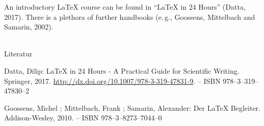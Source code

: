 
An introductory \LaTeX{} course can be found in \enquote{\LaTeX{} in 24 Hours} (Datta, 2017).
There is a plethora of further handbooks (e.\,g., Goossens, Mittelbach and Samarin, 2002).

~\\

\noindent Literatur

\noindent [Datta 2017] Datta, Dilip: LaTeX in 24 Hours - A Practical Guide for Scientific Writing. Springer, 2017. \url{http://dx.doi.org/10.1007/978-3-319-47831-9}. – ISBN 978–3–319–47830–2

\noindent [Goossens u. a. 2010] Goossens, Michel ; Mittelbach, Frank ; Samarin, Alexander: Der LaTeX Begleiter. Addison-Wesley, 2010. – ISBN 978–3–8273–7044–0
